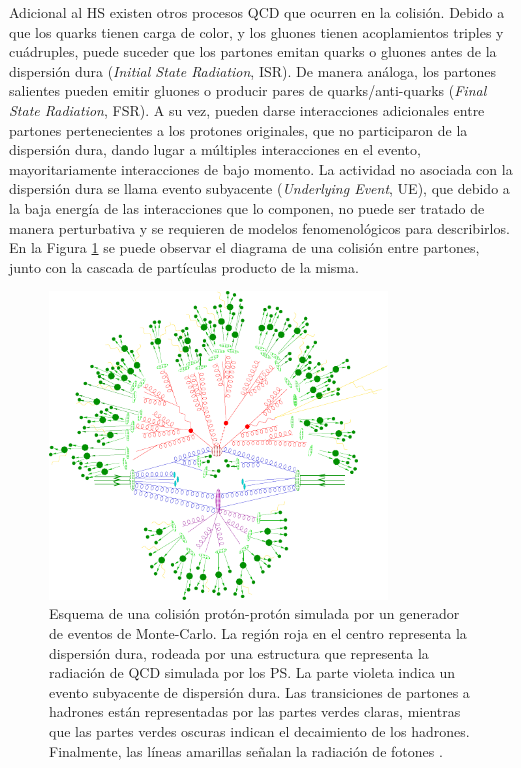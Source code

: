 Adicional al HS existen otros procesos QCD que ocurren en la colisión. Debido a que los quarks tienen carga de color, y los gluones tienen acoplamientos triples y cuádruples, puede suceder que los partones emitan quarks o gluones antes de la dispersión dura (\textit{Initial State Radiation}, ISR). De manera análoga, los partones salientes pueden emitir gluones o
producir pares de quarks/anti-quarks (\textit{Final State Radiation}, FSR). A su vez, pueden darse interacciones adicionales entre partones pertenecientes a los protones originales, que no participaron de la dispersión dura, dando lugar a múltiples
interacciones en el evento, mayoritariamente interacciones de bajo momento. La actividad no asociada con la dispersión dura se llama evento subyacente
(\textit{Underlying Event}, UE), que debido a la baja energía de las interacciones que lo
componen, no puede ser tratado de manera perturbativa y se requieren de modelos
fenomenológicos para describirlos. En la Figura \ref{fig:mc_qcd} se puede observar el diagrama de una colisión entre partones, junto con la cascada de partículas producto de la misma.

\begin{figure}
  \centering
  \includegraphics[width=0.8\textwidth]{images/lhc/mc_qcd.pdf}
  \caption{Esquema de una colisión protón-protón simulada por un generador de
eventos de Monte-Carlo. La región roja en el centro representa la dispersión dura,
rodeada por una estructura que representa la radiación de QCD
simulada por los PS. La parte violeta indica un evento subyacente 
de dispersión dura. Las transiciones de partones a hadrones están representadas
por las partes verdes claras, mientras que las partes verdes oscuras indican el 
decaimiento de los hadrones. Finalmente, las líneas amarillas señalan la radiación de
fotones \cite{mc_simulation}.}
\label{fig:mc_qcd}
\end{figure}

